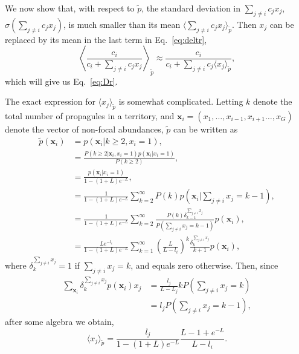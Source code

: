 \documentclass[11pt]{article}
\begin{document}
We now show that, with respect to $\tilde{p}$, the standard deviation in $\sum_{j\neq i} c_j x_j$, $\sigma(\sum_{j\neq i} c_j x_j)$, is much smaller than its mean $\langle\sum_{j\neq i} c_j x_j\rangle_{\tilde{p}}$. Then $x_j$ can be replaced by its mean in the last term in Eq.~\eqref{eq:deltr},
\begin{equation}
\left\langle\frac{c_i}{c_i +\sum_{j\neq i} c_j x_j}\right\rangle_{\tilde{p}}\approx \frac{c_i}{c_i +\sum_{j\neq i} c_j \langle x_j\rangle_{\tilde{p}}},\label{eq:meanfieldr}
\end{equation}
which will give us Eq.~\eqref{eq:Dr}.

The exact expression for $\langle x_j \rangle_{\tilde{p}}$ is somewhat complicated. Letting $k$ denote the total number of propagules in a territory, and ${\mathbf x_i}=(x_1,\ldots,x_{i-1},x_{i+1}\ldots,x_G)$ denote the vector of non-focal abundances, $\tilde{p}$ can be written as
\begin{align}
\tilde{p}({\mathbf x_i})&=p({\mathbf x_i}|k\geq 2,x_i=1),\nonumber\\
&=\frac{P(k\geq 2|{\mathbf x_i},x_i=1) p({\mathbf x_i}|x_i=1)}{P(k\geq 2)},\nonumber\\
&=\frac{p({\mathbf x_i}|x_i=1)}{1-(1+L)e^{-L}},\nonumber\\
&=\frac{1}{1-(1+L)e^{-L}}\sum_{k=2}^{\infty} P(k) p({\mathbf x_i}|\sum_{j\neq i} x_j=k-1),\nonumber\\
&=\frac{1}{1-(1+L)e^{-L}}\sum_{k=2}^{\infty} \frac{P(k)\delta^{\sum_{j\neq i} x_j}_{k-1}}{P(\sum_{j\neq i} x_j=k-1)} p({\mathbf x_i}),\nonumber\\
&=\frac{Le^{-l_i}}{1-(1+L)e^{-L}}\sum_{k=1}^{\infty} \left(\frac{L}{L-l_i}\right)^k\frac{\delta^{\sum_{j\neq i} x_j}_k}{k+1} p({\mathbf x_i}),\label{eq:raremonster}
\end{align}
where $\delta^{\sum_{j\neq i} x_j}_k=1$ if $\sum_{j\neq i} x_j=k$, and equals zero otherwise. Then, since 
\begin{align}
\sum_{\mathbf x_i}\delta^{\sum_{j\neq i} x_j}_k p({\mathbf x_i})x_j&= \frac{l_j}{L-L_j}kP(\sum_{j\neq i} x_j=k)\nonumber\\
&=l_j P(\sum_{j\neq i} x_j=k-1),
\end{align}
after some algebra we obtain,
\begin{equation}
\langle x_j \rangle_{\tilde{p}}=\frac{l_j}{1-(1+L)e^{-L}}\frac{L-1+e^{-L}}{L-l_i}.\label{eq:meanxjrare}
\end{equation}
\end{document}
